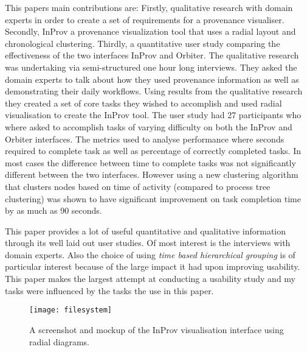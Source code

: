 This papers main contributions are: Firstly, qualitative research with domain experts in order to create a set of requirements for a provenance visualiser. Secondly, InProv a provenance visualization tool that uses a radial layout and chronological clustering. Thirdly, a quantitative user study comparing the effectiveness of the two interfaces InProv and Orbiter. The qualitative research was undertaking via semi-structured one hour long interviews. They asked the domain experts to talk about how they used provenance information as well as demonstrating their daily workflows. Using results from the qualitative research they created a set of core tasks they wished to accomplish and used radial visualisation to create the InProv tool. The user study had 27 participants who where asked to accomplish tasks of varying difficulty on both the InProv and Orbiter interfaces. The metrics used to analyse performance where seconds required to complete task as well as percentage of correctly completed tasks. In most cases the difference between time to complete tasks was not significantly different between the two interfaces. However using a new clustering algorithm that clusters nodes based on time of activity (compared to process tree clustering) was shown to have significant improvement on task completion time by as much as 90 seconds.

This paper provides a lot of useful quantitative and qualitative information through its well laid out user studies. Of most interest is the interviews with domain experts. Also the choice of using \textit{time based hierarchical grouping} is of particular interest because of the large impact it had upon improving usability. This paper makes the largest attempt at conducting a usability study and my tasks were influenced by the tasks the use in this paper.

\begin{figure}[h]
	\centering
	\texttt{[image: filesystem]}
	\caption{A screenshot and mockup of the InProv visualisation interface using radial diagrams.}
	\label{fig:filesystem}
\end{figure}
